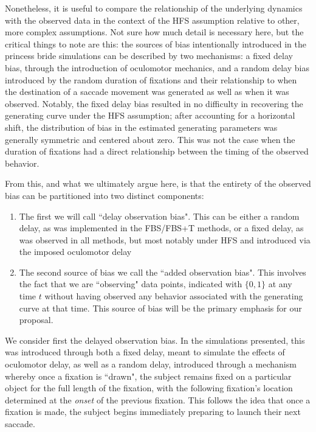 \documentclass{article}
\begin{document}
Nonetheless, it is useful to compare the relationship of the underlying dynamics with the observed data in the context of the HFS assumption relative to other, more complex assumptions. Not sure how much detail is necessary here, but the critical things to note are this: the sources of bias intentionally introduced in the princess bride simulations can be described by two mechanisms: a fixed delay bias, through the introduction of oculomotor mechanics, and a random delay bias introduced by the random duration of fixations and their relationship to when the destination of a saccade movement was generated as well as when it was observed. Notably, the fixed delay bias resulted in no difficulty in recovering the generating curve under the HFS assumption; after accounting for a horizontal shift, the distribution of bias in the estimated generating parameters was generally symmetric and centered about zero. This was not the case when the duration of fixations had a direct relationship between the timing of the observed behavior.

From this, and what we ultimately argue here, is that the entirety of the observed bias can be partitioned into two distinct components:

\begin{singlespace}
\begin{enumerate}
\vspace{-3mm}
\item The first we will call ``delay observation bias". This can be either a random delay, as was implemented in the FBS/FBS+T methods, or a fixed delay, as was observed in all methods, but most notably under HFS and introduced via the imposed oculomotor delay
\item The second source of bias we call the ``added observation bias". This involves the fact that we are ``observing" data points, indicated with $\{0,1\}$ at any time $t$ without having observed any behavior associated with the generating curve at that time. This source of bias will be the primary emphasis for our proposal.
\end{enumerate}
\end{singlespace}

We consider first the delayed observation bias. In the simulations presented, this was introduced through both a fixed delay, meant to simulate the effects of oculomotor delay, as well as a random delay, introduced through a mechanism whereby once a fixation is ``drawn", the subject remains fixed on a particular object for the full length of the fixation, with the following fixation's location determined at the \textit{onset} of the previous fixation. This follows the idea that once a fixation is made, the subject begins immediately  preparing to launch their next saccade. 
\end{document}
